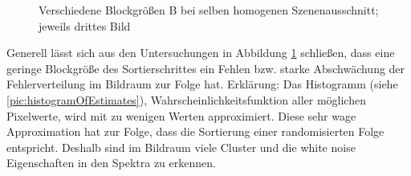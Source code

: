 \begin{figure}[H]
    \caption{Verschiedene Blockgrößen B bei selben homogenen Szenenausschnitt; jeweils drittes Bild}
    \label{fig:VerschiedeneBlockgrößenSorting}
      
\end{figure}

Generell lässt sich aus den Untersuchungen in Abbildung \ref{fig:VerschiedeneBlockgrößenSorting} schließen,
dass eine geringe Blockgröße des Sortierschrittes ein Fehlen bzw. starke Abschwächung der 
 Fehlerverteilung im Bildraum zur Folge hat. Erklärung: Das Histogramm
(siehe \ref{pic:histogramOfEstimates}), Wahrscheinlichkeitsfunktion
aller möglichen Pixelwerte, wird mit zu wenigen Werten approximiert. Diese sehr wage Approximation 
hat zur Folge, dass die Sortierung einer randomisierten Folge entspricht. Deshalb sind im Bildraum
viele Cluster und die white noise Eigenschaften in den Spektra zu erkennen.


\newpage

